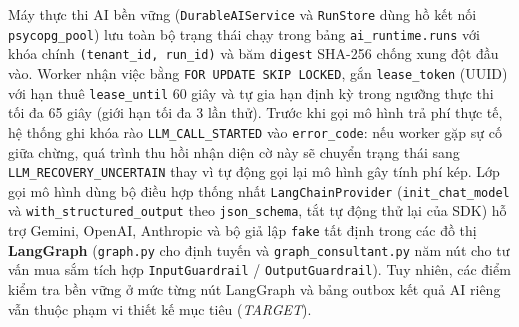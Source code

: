 Máy thực thi AI bền vững (\texttt{DurableAIService} và \texttt{RunStore} dùng hồ kết nối \texttt{psycopg\_\hspace{0pt}pool}) lưu toàn bộ trạng thái chạy trong bảng \texttt{ai\_\hspace{0pt}runtime.\hspace{0pt}runs} với khóa chính
\texttt{(tenant\_\hspace{0pt}id, run\_\hspace{0pt}id)} và băm \texttt{digest} SHA-256 chống xung đột đầu vào. Worker nhận việc bằng \texttt{FOR UPDATE SKIP LOCKED}, gắn \texttt{lease\_\hspace{0pt}token} (UUID) với hạn thuê
\texttt{lease\_\hspace{0pt}until} 60 giây và tự gia hạn định kỳ trong ngưỡng thực thi tối đa 65 giây (giới hạn tối đa 3 lần thử). Trước khi gọi mô hình trả phí thực tế, hệ thống ghi khóa rào
\texttt{LLM\_\hspace{0pt}CALL\_\hspace{0pt}STARTED} vào \texttt{error\_\hspace{0pt}code}: nếu worker gặp sự cố giữa chừng, quá trình thu hồi nhận diện cờ này sẽ chuyển trạng thái sang \texttt{LLM\_\hspace{0pt}RECOVERY\_\hspace{0pt}UNCERTAIN} thay vì tự
động gọi lại mô hình gây tính phí kép. Lớp gọi mô hình dùng bộ điều hợp thống nhất \texttt{LangChainProvider} (\texttt{init\_\hspace{0pt}chat\_\hspace{0pt}model} và \texttt{with\_\hspace{0pt}structured\_\hspace{0pt}output} theo
\texttt{json\_\hspace{0pt}schema}, tắt tự động thử lại của SDK) \cite{langchain} hỗ trợ Gemini, OpenAI, Anthropic và bộ giả lập \texttt{fake} tất định trong các đồ thị \textbf{LangGraph} (\texttt{graph.\hspace{0pt}py} cho định tuyến và
\texttt{graph\_\hspace{0pt}consultant.\hspace{0pt}py} năm nút cho tư vấn mua sắm tích hợp \texttt{InputGuardrail} / \texttt{OutputGuardrail}). Tuy nhiên, các điểm kiểm tra bền vững ở mức từng nút LangGraph và bảng
outbox kết quả AI riêng vẫn thuộc phạm vi thiết kế mục tiêu (\emph{TARGET}).


